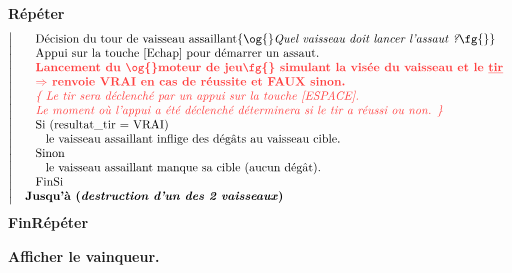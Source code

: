 \documentclass[10pt, fleqn, a4paper]{article}
\newenvironment{algorithme}
{
\begingroup

\footnotesize

\hrulefill

}
{

\hrulefill

\endgroup
}
\newcommand{\itcolor}[2]{\textcolor{#1}{\textit{#2}}}
\begin{document}
\begin{itemize}
\begin{algorithme}
\textbf{Répéter}
\begin{equation*}
\left| \begin{array}{l}
\hspace{5mm}\text{Décision du tour de vaisseau assaillant} \{ \og{}\textit{Quel vaisseau doit lancer l'assaut ?}\fg{}\} \\
\hspace{5mm}\text{Appui sur la touche [Echap] pour démarrer un assaut.} \\
\hspace{5mm}\text{\bf \color{redCM}Lancement du \og{}moteur de jeu\fg{} simulant la visée du vaisseau et le \underline{tir}}\\
\hspace{5mm}\text{\bf \color{redCM}$\Rightarrow$ renvoie VRAI en cas de réussite et FAUX sinon.} \\
\hspace{5mm}\text{\itcolor{redCM}{\{ Le tir sera déclenché par un appui sur la touche [ESPACE].}}\\
\hspace{5mm}\text{\itcolor{redCM}{Le moment où l'appui a été déclenché déterminera si le tir a réussi ou non. \}}}\\
\hspace{5mm}\text{Si (resultat\_tir = VRAI)} \\
\hspace{8mm}\text{le vaisseau assaillant inflige des dégâts au vaisseau cible.}\\
\hspace{5mm}\text{Sinon} \\
\hspace{8mm}\text{le vaisseau assaillant manque sa cible (aucun dégât).}\\
\hspace{5mm}\text{FinSi}\\
\hspace{2mm}\text{\bf Jusqu'à (\textit{destruction d'un des 2 vaisseaux})}
\end{array} \right.
\end{equation*}
\textbf{FinRépéter}

\textbf{Afficher le vainqueur.}

\end{algorithme}
\end{itemize}
\end{document}
